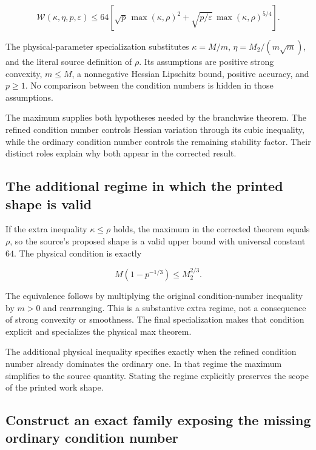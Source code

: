 \documentclass[11pt,a4paper]{report}
\begin{document}
\[\mathcal W(\kappa,\eta,p,\varepsilon)\le64\left[\sqrt p\,\max(\kappa,\rho)^2+\sqrt{p/\varepsilon}\,\max(\kappa,\rho)^{5/4}\right].\]

The physical-parameter specialization substitutes \(\kappa=M/m\), \(\eta=M_2/(m\sqrt m)\), and the literal source definition of \(\rho\). Its assumptions are positive strong convexity, \(m\le M\), a nonnegative Hessian Lipschitz bound, positive accuracy, and \(p\ge1\). No comparison between the condition numbers is hidden in those assumptions.



The maximum supplies both hypotheses needed by the branchwise theorem. The refined condition number controls Hessian variation through its cubic inequality, while the ordinary condition number controls the remaining stability factor. Their distinct roles explain why both appear in the corrected result.

\subsection{\texorpdfstring{The additional regime in which the printed shape is valid}{The additional regime in which the printed shape is valid}}
\label{report-step-KineticLangevin-ConditionNumber-lean-6}


If the extra inequality \(\kappa\le\rho\) holds, the maximum in the corrected theorem equals \(\rho\), so the source's proposed shape is a valid upper bound with universal constant \(64\). The physical condition is exactly

\[M(1-p^{-1/3})\le M_2^{2/3}.\]

The equivalence follows by multiplying the original condition-number inequality by \(m>0\) and rearranging. This is a substantive extra regime, not a consequence of strong convexity or smoothness. The final specialization makes that condition explicit and specializes the physical max theorem.



The additional physical inequality specifies exactly when the refined condition number already dominates the ordinary one. In that regime the maximum simplifies to the source quantity. Stating the regime explicitly preserves the scope of the printed work shape.

\subsection{\texorpdfstring{Construct an exact family exposing the missing ordinary condition number}{Construct an exact family exposing the missing ordinary condition number}}
\label{report-step-KineticLangevin-ConditionNumber-lean-7}
\end{document}
